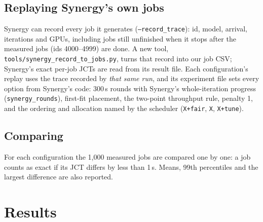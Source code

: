 \documentclass[11pt,a4paper]{article}
\newcommand{\code}[1]{\texttt{#1}}
\begin{document}
\subsection{Replaying Synergy's own jobs}
Synergy can record every job it generates (\code{--record\_trace}): id, model, arrival, iterations and GPUs,
including jobs still unfinished when it stops after the measured jobs (ids 4000--4999) are done. A new tool,
\code{tools/synergy\_record\_to\_jobs.py}, turns that record into our job CSV; Synergy's exact per-job JCTs are read
from its result file. Each configuration's replay uses the trace recorded by \emph{that same run}, and its
experiment file sets every option from Synergy's code: 300\,s rounds with Synergy's whole-iteration progress
(\code{synergy\_rounds}), first-fit placement, the two-point throughput rule, penalty 1, and the ordering and
allocation named by the scheduler (\code{X+fair}, \code{X}, \code{X+tune}).

\subsection{Comparing}
For each configuration the 1{,}000 measured jobs are compared one by one: a job counts as exact if its JCT
differs by less than 1\,s. Means, 99th percentiles and the largest difference are also reported.

\section{Results}
\end{document}
